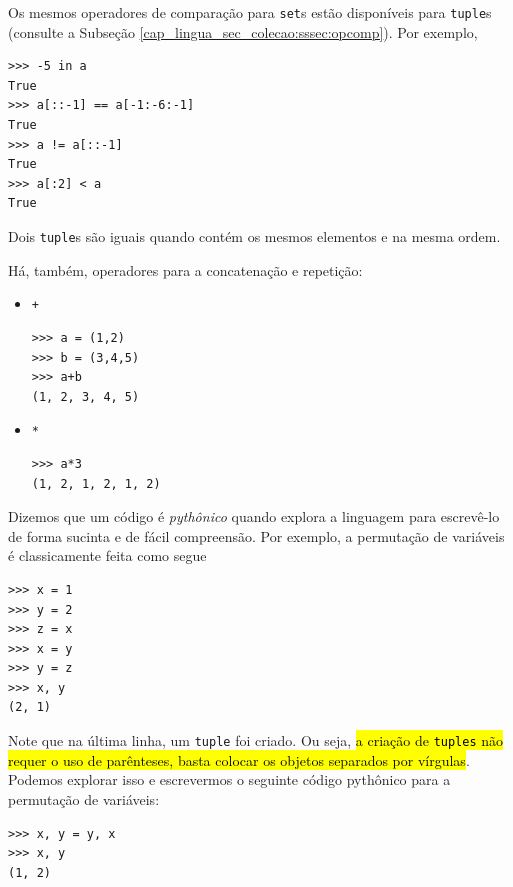 Os mesmos operadores de comparação para \lstinline+set+s estão disponíveis para \lstinline+tuple+s (consulte a Subseção \ref{cap_lingua_sec_colecao:sssec:opcomp}). Por exemplo,

\begin{lstlisting}
>>> -5 in a
True
>>> a[::-1] == a[-1:-6:-1]
True
>>> a != a[::-1]
True
>>> a[:2] < a
True
\end{lstlisting}

\begin{obs}
  Dois \lstinline+tuple+s são iguais quando contém os mesmos elementos e na mesma ordem.
\end{obs}

Há, também, operadores para a concatenação e repetição:
\begin{itemize}
\item \lstinline!+! 

\begin{lstlisting}[framexrightmargin=-2.5em]
>>> a = (1,2)
>>> b = (3,4,5)
>>> a+b
(1, 2, 3, 4, 5)
\end{lstlisting}

\item \lstinline!*! 

\begin{lstlisting}[framexrightmargin=-2.5em]
>>> a*3
(1, 2, 1, 2, 1, 2)
\end{lstlisting}
\end{itemize}

\begin{obs}
  Dizemos que um código é \emph{pythônico} quando explora a linguagem para escrevê-lo de forma sucinta e de fácil compreensão. Por exemplo, a permutação de variáveis é classicamente feita como segue

\begin{lstlisting}
>>> x = 1
>>> y = 2
>>> z = x
>>> x = y
>>> y = z
>>> x, y
(2, 1)
\end{lstlisting}

Note que na última linha, um \lstinline+tuple+ foi criado. Ou seja, \hl{a criação de \texttt{tuples} não requer o uso de parênteses, basta colocar os objetos separados por vírgulas}. Podemos explorar isso e escrevermos o seguinte código pythônico para a permutação de variáveis:

\begin{lstlisting}
>>> x, y = y, x
>>> x, y
(1, 2)
\end{lstlisting}

\end{obs}

